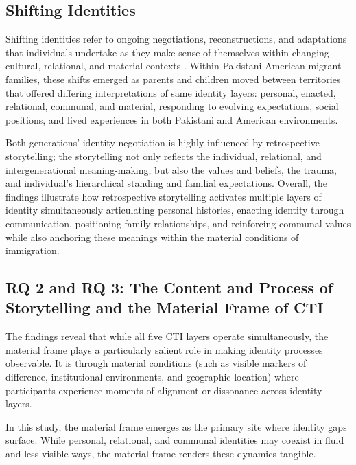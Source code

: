 \subsection{Shifting Identities}

Shifting identities refer to ongoing negotiations, reconstructions, and adaptations that individuals undertake as they make sense of themselves within changing cultural, relational, and material contexts \citep{hechtCommunicationTheoryIdentity2021,shinCommunicationTheoryIdentity2017}. Within Pakistani American migrant families, these shifts emerged as parents and children moved between territories that offered differing interpretations of same identity layers: personal, enacted, relational, communal, and material, responding to evolving expectations, social positions, and lived experiences in both Pakistani and American environments.

Both generations’ identity negotiation is highly influenced by retrospective storytelling; the storytelling not only reflects the individual, relational, and intergenerational meaning-making, but also the values and beliefs, the trauma, and individual’s hierarchical standing and familial expectations. Overall, the findings illustrate how retrospective storytelling activates multiple layers of identity simultaneously articulating personal histories, enacting identity through communication, positioning family relationships, and reinforcing communal values while also anchoring these meanings within the material conditions of immigration.

\subsection{RQ 2 and RQ 3: The Content and Process of Storytelling and the Material Frame of CTI}

The findings reveal that while all five CTI layers operate simultaneously, the material frame plays a particularly salient role in making identity processes observable. It is through material conditions (such as visible markers of difference, institutional environments, and geographic location) where participants experience moments of alignment or dissonance across identity layers.

In this study, the material frame emerges as the primary site where identity gaps surface. While personal, relational, and communal identities may coexist in fluid and less visible ways, the material frame renders these dynamics tangible. 


